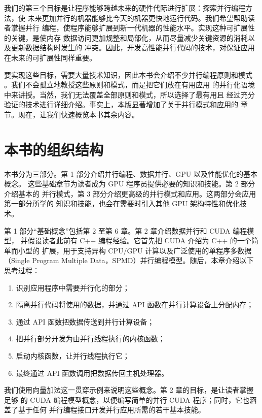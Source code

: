 我们的第三个目标是让程序能够跨越未来的硬件代际进行扩展：探索并行编程方法，使
未来更加并行的机器能够比今天的机器更快地运行代码。我们希望帮助读者掌握并行
编程，使程序能够扩展到新一代机器的性能水平。实现这种可扩展性的关键，是使内存
数据访问更加规整和局部化，从而尽量减少关键资源的消耗以及更新数据结构时发生的
冲突。因此，开发高性能并行代码的技术，对保证应用在未来的可扩展性同样重要。

要实现这些目标，需要大量技术知识，因此本书会介绍不少并行编程原则和模式
\cite{mattson2004}。我们不会孤立地教授这些原则和模式，而是把它们放在有用应用
的并行化语境中来讲授。当然，我们无法覆盖全部原则和模式，所以选择了最有用且
经过充分验证的技术进行详细介绍。事实上，本版显著增加了关于并行模式和应用的
章节。现在，让我们快速概览本书其余内容。

\section{本书的组织结构}
\label{sec:book-organization}

本书分为三部分。第 1 部分介绍并行编程、数据并行、GPU 以及性能优化的基本概念。
这些基础章节为读者成为 GPU 程序员提供必要的知识和技能。第 2 部分介绍基本的
并行模式，第 3 部分介绍更高级的并行模式和应用。这两部分会应用第一部分所学的
知识和技能，也会在需要时引入其他 GPU 架构特性和优化技术。

第 1 部分“基础概念”包括第 2 至第 6 章。第 2 章介绍数据并行和 CUDA 编程模型，
并假设读者此前有 C++ 编程经验。它首先把 CUDA 介绍为 C++ 的一个简单而小型的
扩展，用于支持异构 CPU/GPU 计算以及广泛使用的单程序多数据（Single Program
Multiple Data，SPMD）并行编程模型。随后，本章介绍以下思考过程：

\begin{enumerate}
  \item 识别应用程序中需要并行化的部分；
  \item 隔离并行代码将使用的数据，并通过 API 函数在并行计算设备上分配内存；
  \item 通过 API 函数把数据传送到并行计算设备；
  \item 把并行部分开发为由并行线程执行的内核函数；
  \item 启动内核函数，让并行线程执行它；
  \item 最终通过 API 函数调用把数据传回主机处理器。
\end{enumerate}

我们使用向量加法这一贯穿示例来说明这些概念。第 2 章的目标，是让读者掌握足够
的 CUDA 编程模型概念，以便编写简单的并行 CUDA 程序；同时，它也涵盖了基于任何
并行编程接口开发并行应用所需的若干基本技能。

